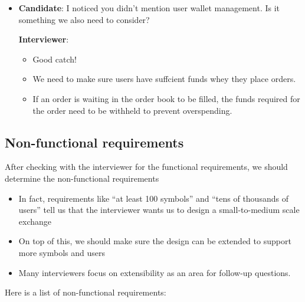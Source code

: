 \documentclass{report}
\theoremstyle{definition}
\let\oldsubsection\subsection
\renewcommand{\subsection}{\oldsubsection*}
\begin{document}
\begin{itemize}
\textbf{Interviewer}: Let's just do simple risk checks. FOr example, a user can only trade a maximum of 1 million shares of Apple stock in one day.

\item

\textbf{Candidate}: I noticed you didn't mention user wallet management. Is it something we also need to consider?

\textbf{Interviewer}:

\begin{itemize}
\item
Good catch!
\item
We need to make sure users have suffcient funds whey they place orders.
\item
If an order is waiting in the order book to be filled, the funds required for the order need to be withheld to prevent overspending.
\end{itemize}
\end{itemize}

\subsection{Non-functional requirements}

After checking with the interviewer for the functional requirements, we should determine the non-functional requirements
\begin{itemize}
\item
In fact, requirements like ``at least 100 symbols'' and ``tens of thousands of users'' tell us that the interviewer wants us to design a small-to-medium scale exchange
\item
On top of this, we should make sure the design can be extended to support more symbols and users
\item
Many interviewers focus on extensibility as an area for follow-up questions.
\end{itemize}

Here is a list of non-functional requirements:
\end{document}
